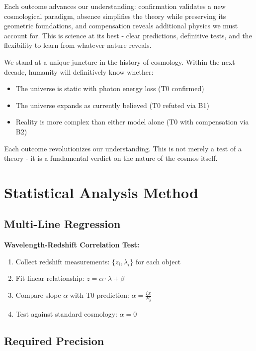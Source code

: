 \documentclass[12pt,a4paper]{article}
\newcommand{\Exi}{E_\xi}
\theoremstyle{definition}
\begin{document}
	Each outcome advances our understanding: confirmation validates a new cosmological paradigm, absence simplifies the theory while preserving its geometric foundations, and compensation reveals additional physics we must account for. This is science at its best - clear predictions, definitive tests, and the flexibility to learn from whatever nature reveals.
	
	\begin{revolutionary}[title=A Historic Moment in Physics]
		We stand at a unique juncture in the history of cosmology. Within the next decade, humanity will definitively know whether:
		\begin{itemize}
			\item The universe is static with photon energy loss (T0 confirmed)
			\item The universe expands as currently believed (T0 refuted via B1)
			\item Reality is more complex than either model alone (T0 with compensation via B2)
		\end{itemize}
		Each outcome revolutionizes our understanding. This is not merely a test of a theory - it is a fundamental verdict on the nature of the cosmos itself.
	\end{revolutionary}	
	
	\section{Statistical Analysis Method}
	
	\subsection{Multi-Line Regression}
	
	\begin{experiment}
		\textbf{Wavelength-Redshift Correlation Test:}
		\begin{enumerate}
			\item Collect redshift measurements: $\{z_i, \lambda_i\}$ for each object
			\item Fit linear relationship: $z = \alpha \cdot \lambda + \beta$
			\item Compare slope $\alpha$ with T0 prediction: $\alpha = \frac{\xi x}{\Exi}$
			\item Test against standard cosmology: $\alpha = 0$
		\end{enumerate}
	\end{experiment}
	
	\subsection{Required Precision}
	
\end{document}
